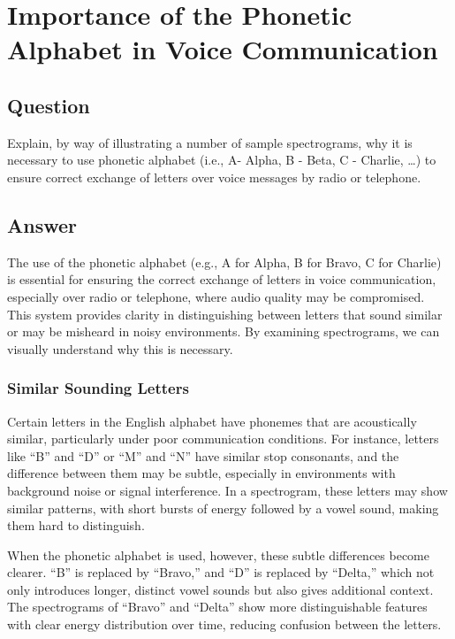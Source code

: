 
\section{Importance of the Phonetic Alphabet in Voice Communication}

\subsection{Question}
Explain, by way of illustrating a number of sample spectrograms, why it is necessary to use phonetic alphabet (i.e., A- Alpha, B - Beta, C - Charlie, …) to ensure correct exchange of letters over voice messages by radio or telephone.

\subsection{Answer}
The use of the phonetic alphabet (e.g., A for Alpha, B for Bravo, C for Charlie) is essential for ensuring the correct exchange of letters in voice communication, especially over radio or telephone, where audio quality may be compromised. This system provides clarity in distinguishing between letters that sound similar or may be misheard in noisy environments. By examining spectrograms, we can visually understand why this is necessary.

\subsubsection*{Similar Sounding Letters}
Certain letters in the English alphabet have phonemes that are acoustically similar, particularly under poor communication conditions. For instance, letters like ``B'' and ``D'' or ``M'' and ``N'' have similar stop consonants, and the difference between them may be subtle, especially in environments with background noise or signal interference. In a spectrogram, these letters may show similar patterns, with short bursts of energy followed by a vowel sound, making them hard to distinguish.

When the phonetic alphabet is used, however, these subtle differences become clearer. ``B'' is replaced by ``Bravo,'' and ``D'' is replaced by ``Delta,'' which not only introduces longer, distinct vowel sounds but also gives additional context. The spectrograms of ``Bravo'' and ``Delta'' show more distinguishable features with clear energy distribution over time, reducing confusion between the letters.

